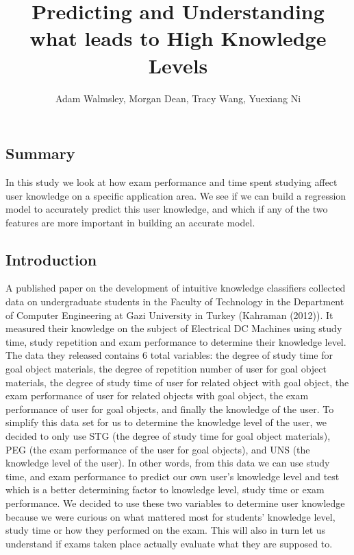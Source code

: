 \documentclass[
  letterpaper,
  DIV=11,
  numbers=noendperiod]{scrartcl}
\title{Predicting and Understanding what leads to High Knowledge Levels}
\author{Adam Walmsley, Morgan Dean, Tracy Wang, Yuexiang Ni}
\date{}
\begin{document}
\maketitle


\subsection{\texorpdfstring{\textbf{Summary}}{Summary}}\label{summary}

In this study we look at how exam performance and time spent studying
affect user knowledge on a specific application area. We see if we can
build a regression model to accurately predict this user knowledge, and
which if any of the two features are more important in building an
accurate model.

\subsection{\texorpdfstring{\textbf{Introduction}}{Introduction}}\label{introduction}

A published paper on the development of intuitive knowledge classifiers
collected data on undergraduate students in the Faculty of Technology in
the Department of Computer Engineering at Gazi University in Turkey
(Kahraman (2012)). It measured their knowledge on the subject of
Electrical DC Machines using study time, study repetition and exam
performance to determine their knowledge level. The data they released
contains 6 total variables: the degree of study time for goal object
materials, the degree of repetition number of user for goal object
materials, the degree of study time of user for related object with goal
object, the exam performance of user for related objects with goal
object, the exam performance of user for goal objects, and finally the
knowledge of the user. To simplify this data set for us to determine the
knowledge level of the user, we decided to only use STG (the degree of
study time for goal object materials), PEG (the exam performance of the
user for goal objects), and UNS (the knowledge level of the user). In
other words, from this data we can use study time, and exam performance
to predict our own user's knowledge level and test which is a better
determining factor to knowledge level, study time or exam performance.
We decided to use these two variables to determine user knowledge
because we were curious on what mattered most for students' knowledge
level, study time or how they performed on the exam. This will also in
turn let us understand if exams taken place actually evaluate what they
are supposed to.
\end{document}

